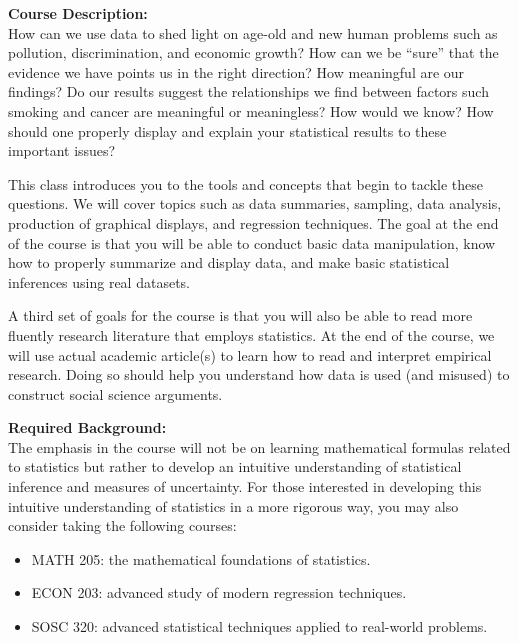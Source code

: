 \documentclass[11pt]{article}
\begin{document}
\vspace{1.5cm}
\large \textbf{Course Description:}\\[0.5em]
How can we use data to shed light on age-old and new human problems such as pollution, discrimination, and economic growth? How can we be “sure” that the evidence we have points us in the right direction? How meaningful are our findings? Do our results suggest the relationships we find between factors such smoking and cancer are meaningful or meaningless? How would we know? How should one properly display and explain your statistical results to these important issues?

This class introduces you to the tools and concepts that begin to tackle these questions. We will cover topics such as data summaries, sampling, data analysis, production of graphical displays, and regression techniques. The goal at the end of the course is that you will be able to conduct basic data manipulation, know how to properly summarize and display data, and make basic statistical inferences using real datasets.

A third set of goals for the course is that you will also be able to read more fluently research literature that employs statistics. At the end of the course, we will use actual academic article(s) to learn how to read and interpret empirical research. Doing so should help you understand how data is used (and misused) to construct social science arguments.


\vspace{0.5cm}
\large \textbf{Required Background:}\\[0.5em]
The emphasis in the course will not be on learning mathematical formulas related to statistics but rather to develop an intuitive understanding of statistical inference and measures of uncertainty. For those interested in developing this intuitive understanding of statistics in a more rigorous way, you may also consider taking the following courses:
\begin{itemize}
    \item MATH 205: the mathematical foundations of statistics.
    \item ECON 203: advanced study of modern regression techniques.
    \item SOSC 320: advanced statistical techniques applied to real-world problems.
\end{itemize}
\end{document}
